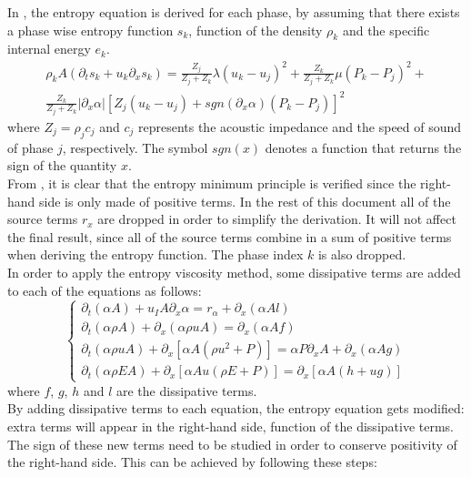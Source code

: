 In \cite{SEM}, the entropy equation is derived for each phase, by assuming that there exists a phase wise entropy function $s_k$, function of the density $\rho_k$ and the specific internal energy $e_k$.
\begin{eqnarray}
\label{eq:sev_equ2}
\rho_k A \left( \partial_t s_k + u_k \partial_x s_k \right) = \frac{Z_j}{Z_j+Z_k} \lambda \left( u_k - u_j \right)^2 + \frac{Z_k}{Z_j+Z_k} \mu \left( P_k-P_j \right)^2 + \nonumber \\ 
\frac{Z_k}{Z_j+Z_k} \left| \partial_x \alpha \right| \left[ Z_j \left( u_k-u_j \right) +sgn\left( \partial_x \alpha \right) \left( P_k-P_j \right) \right]^2
\end{eqnarray}
where $Z_j = \rho_j c_j$ and $c_j$ represents the acoustic impedance and the speed of sound of phase $j$, respectively. The symbol $sgn(x)$ denotes a function that returns the sign of the quantity $x$.\\
From , it is clear that the entropy minimum principle is verified since the right-hand side is only made of positive terms. In the rest of this document all of the source terms $r_x$ are dropped in order to simplify the derivation. It will not affect the final result, since all of the source terms combine in a sum of positive terms when deriving the entropy function. The phase index $k$ is also dropped.\\
In order to apply the entropy viscosity method, some dissipative terms are added to each of the equations as follows:
\begin{equation}
\label{eq:sev_equ3}
\left\{
\begin{array}{llll}
\partial_t \left( \alpha  A\right) + u_I A \partial_x \alpha =  r_{\alpha} + \partial_x (\alpha Al)\\
\partial_t \left( \alpha \rho A \right) + \partial_x \left( \alpha \rho u A \right) = \partial_x \left( \alpha A f \right)\\
\partial_t \left( \alpha \rho u A \right) + \partial_x \left[ \alpha A \left( \rho u^2 + P \right) \right] =  \alpha P \partial_x A + \partial_x \left( \alpha A g \right)\\
\partial_t \left( \alpha \rho E A \right) + \partial_x \left[ \alpha A u \left( \rho E + P \right) \right] = \partial_x \left[ \alpha A \left( h +  u g\right) \right]
\end{array}
\right.
\end{equation}
where $f$, $g$, $h$ and $l$ are the dissipative terms. \\
By adding dissipative terms to each equation, the entropy equation gets modified: extra terms will appear in the right-hand side, function of the dissipative terms. The sign of these new terms need to be studied in order to conserve positivity of the right-hand side. This can be achieved by following these steps:
